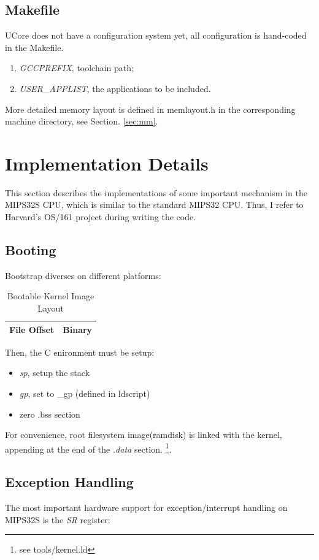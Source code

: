 \documentclass[a4paper]{article}
\begin{document}
\subsection{Makefile}
UCore does not have a configuration system yet, all configuration
is hand-coded in the Makefile.
\begin{enumerate}
\item \emph{GCCPREFIX}, toolchain path;
\item \emph{USER\_APPLIST}, the applications to be included.
\end{enumerate}

More detailed memory layout is defined in memlayout.h in the corresponding
machine directory, see Section. \ref{sec:mm}.

\section{Implementation Details}
This section describes the implementations of some important mechanism 
in the MIPS32S CPU, which is similar to the standard MIPS32 CPU.
Thus, I refer to Harvard's OS/161\cite{OS161} project during writing the code.

\subsection{Booting}
Bootstrap diverses on different platforms: 
\begin{table}[h]
  \centering
  \begin{tabular}{|r|r|}
    \hline
    File Offset & Binary \\
    \hline
    \hline
  \end{tabular}
  \caption{Bootable Kernel Image Layout}
  \label{tab:layout}
\end{table}

Then, the C enironment must be setup:
\begin{itemize}
\item \emph{sp}, setup the stack
\item \emph{gp}, set to \_gp (defined in ldscript)
\item zero .bss section
\end{itemize}

For convenience, root filesystem image(ramdisk) is linked
with the kernel, appending at the end of the \emph{.data} section.
\footnote{see tools/kernel.ld}.

\subsection{Exception Handling}
The most important hardware support for exception/interrupt handling on MIPS32S is the \emph{SR}
register:
\end{document}
